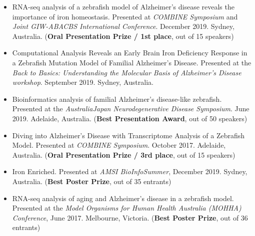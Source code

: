 \documentclass[10pt,a4paper,ragged2e,withhyper]{altacv2}
\begin{document}
\begin{paracol}{2}
\textbf{}
\begin{itemize}
    \item RNA-seq analysis of a zebrafish model of Alzheimer’s disease reveals the importance of iron homeostasis. Presented at \textit{COMBINE Symposium} and \textit{Joint GIW-ABACBS International Conference}. December 2019. Sydney, Australia. (\textbf{Oral Presentation Prize / 1st place}, out of 15 speakers)
    \item Computational Analysis Reveals an Early Brain Iron Deficiency Response in a Zebrafish Mutation Model of Familial Alzheimer’s Disease. Presented at the \textit{Back to Basics: Understanding the Molecular Basis of Alzheimer’s Disease workshop}. September 2019. Sydney, Australia.
    \item Bioinformatics analysis of familial Alzheimer’s disease-like zebrafish. Presented at the \textit{AustraliaJapan Neurodegenerative Disease Symposium}. June 2019. Adelaide, Australia. (\textbf{Best Presentation Award}, out of 50 speakers)
    \item Diving into Alzheimer’s Disease with Transcriptome Analysis of a Zebrafish Model. Presented at \textit{COMBINE Symposium}. October 2017. Adelaide, Australia. (\textbf{Oral Presentation Prize / 3rd place}, out of 15 speakers)
\end{itemize}

\divider

\textbf{}
\begin{itemize}
    \item Iron Enriched. Presented at \textit{AMSI BioInfoSummer}, December 2019. Sydney, Australia. (\textbf{Best Poster Prize}, out of 35 entrants)
    \item RNA-seq analysis of aging and Alzheimer’s disease in a zebrafish model. Presented at the \textit{Model Organisms for Human Health Australia (MOHHA) Conference}, June 2017. Melbourne, Victoria. (\textbf{Best Poster Prize}, out of 36 entrants)
\end{itemize}
\medskip

\end{paracol}
\newpage


\end{document}
